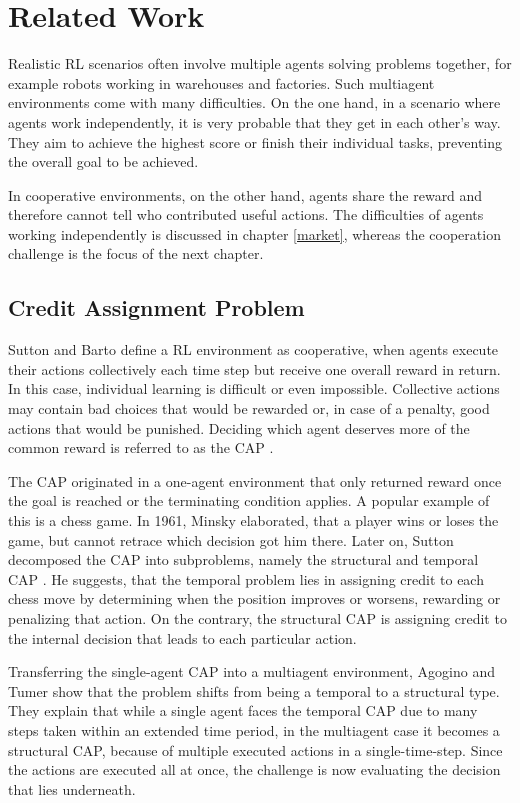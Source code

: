 \chapter{Related Work}\label{sec:RelatedWork}
Realistic RL scenarios often involve multiple agents solving problems together, for example robots working in warehouses and factories. Such multiagent environments come with many difficulties. On the one hand, in a scenario where agents work independently, it is very probable that they get in each other's way. They aim to achieve the highest score or finish their individual tasks, preventing the overall goal to be achieved.

In cooperative environments, on the other hand, agents share the reward and therefore cannot tell who contributed useful actions. The difficulties of agents working independently is discussed in chapter \ref{market}, whereas the cooperation challenge is the focus of the next chapter.

\section{Credit Assignment Problem}\label{CAP}
Sutton and Barto \cite{suba18} define a RL environment as cooperative, when agents execute their actions collectively each time step but receive one overall reward in return. In this case, individual learning is difficult or even impossible. Collective actions may contain bad choices that would be rewarded or, in case of a penalty, good actions that would be punished. Deciding which agent deserves more of the common reward is referred to as the CAP \cite{mi61}.

The CAP originated in a one-agent environment that only returned reward once the goal is reached or the terminating condition applies. A popular example of this is a chess game. In 1961, Minsky \cite{mi61} elaborated, that a player wins or loses the game, but cannot retrace which decision got him there. Later on, Sutton decomposed the CAP into subproblems, namely the structural and temporal CAP \cite{su84}. He suggests, that the temporal problem lies in assigning credit to each chess move by determining when the position improves or worsens, rewarding or penalizing that action. On the contrary, the structural CAP is assigning credit to the internal decision that leads to each particular action.

Transferring the single-agent CAP into a multiagent environment, Agogino and Tumer \cite{agtu04} show that the problem shifts from being a temporal to a structural type. They explain that while a single agent faces the temporal CAP due to many steps taken within an extended time period, in the multiagent case it becomes a structural CAP, because of multiple executed actions in a single-time-step. Since the actions are executed all at once, the challenge is now evaluating the decision that lies underneath.

